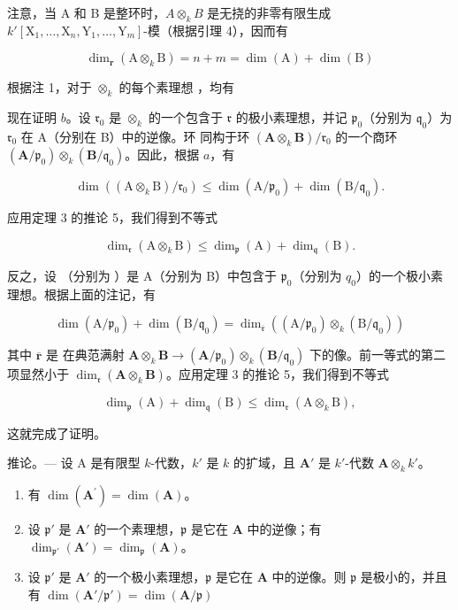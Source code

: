 注意，当 A 和 B 是整环时，\(A \otimes_k B\) 是无挠的非零有限生成 \(k'[\mathrm{X}_{1}, \ldots, \mathrm{X}_{n}, \mathrm{Y}_{1}, \ldots, \mathrm{Y}_{m}]\)-模（根据引理 4），因而有

\[
\dim_ {\mathbf {r}} (\mathrm{A} \otimes_ {k} \mathrm{B}) = n + m = \dim (\mathrm{A}) + \dim (\mathrm{B})
\]

  根据注 1，对于 \(\otimes_{k}\) 的每个素理想  ，均有

现在证明 \(b\)。设 \(\mathfrak{r}_{0}\) 是 \(\otimes_{k}\) 的一个包含于 \(\mathfrak{r}\) 的极小素理想，并记 \(\mathfrak{p}_{0}\)（分别为 \(\mathfrak{q}_{0}\)）为 \(\mathfrak{r}_{0}\) 在 A（分别在 B）中的逆像。环  同构于环 \((\mathbf{A} \otimes_k \mathbf{B}) / \mathfrak{r}_{0}\) 的一个商环 \((\mathbf{A} / \mathfrak{p}_{0}) \otimes_k (\mathbf{B} / \mathfrak{q}_{0})\)。因此，根据 \(a\)，有

\[
\dim \left(\left(\mathrm{A} \otimes_ {k} \mathrm{B}\right) / \mathfrak {r} _ {0}\right) \leqslant \dim (\mathrm{A} / \mathfrak {p} _ {0}) + \dim (\mathrm{B} / \mathfrak {q} _ {0}).
\]

应用定理 3 的推论 5，我们得到不等式

\[
\dim_ {\mathfrak {r}} (\mathrm{A} \otimes_ {k} \mathrm{B}) \leqslant \dim_ {\mathfrak {p}} (\mathrm{A}) + \dim_ {\mathfrak {q}} (\mathrm{B}).
\]

反之，设  （分别为 ）是 A（分别为 B）中包含于 \(\mathfrak{p}_{0}\)（分别为 \(q_{0}\)）的一个极小素理想。根据上面的注记，有

\[
\dim (\mathrm{A} / \mathfrak {p} _ {0}) + \dim (\mathrm{B} / \mathfrak {q} _ {0}) = \dim_ {\overline {{\mathfrak {r}}}} ((\mathrm{A} / \mathfrak {p} _ {0}) \otimes_ {k} (\mathrm{B} / \mathfrak {q} _ {0}))
\]

其中 \(\overline{\mathbf{r}}\) 是  在典范满射 \(\mathbf{A} \otimes_{k} \mathbf{B} \to (\mathbf{A}/\mathfrak{p}_{0}) \otimes_{k} (\mathbf{B}/\mathfrak{q}_{0})\) 下的像。前一等式的第二项显然小于 \(\dim_{\mathfrak{r}}(\mathbf{A} \otimes_{k} \mathbf{B})\)。应用定理 3 的推论 5，我们得到不等式

\[
\dim_ {\mathfrak {p}} (\mathrm{A}) + \dim_ {\mathfrak {q}} (\mathrm{B}) \leqslant \dim_ {\mathfrak {r}} (\mathrm{A} \otimes_ {k} \mathrm{B}),
\]

这就完成了证明。

推论。--- 设 A 是有限型 \(k\)-代数，\(k'\) 是 \(k\) 的扩域，且 \(\mathbf{A}'\) 是 \(k'\)-代数 \(\mathbf{A} \otimes_k k'\)。

\begin{enumerate}
\def\labelenumi{\alph{enumi})}
\item
  有 \(\dim (\mathbf{A}^{\prime}) = \dim (\mathbf{A})\)。
\item
  设 \(\mathfrak{p}'\) 是 \(\mathbf{A}'\) 的一个素理想，\(\mathfrak{p}\) 是它在 \(\mathbf{A}\) 中的逆像；有 \(\dim_{\mathfrak{p}'}(\mathbf{A}') = \dim_{\mathfrak{p}}(\mathbf{A})\)。
\item
  设 \(\mathfrak{p}'\) 是 \(\mathbf{A}'\) 的一个极小素理想，\(\mathfrak{p}\) 是它在 \(\mathbf{A}\) 中的逆像。则 \(\mathfrak{p}\) 是极小的，并且有 \(\dim(\mathbf{A}'/\mathfrak{p}') = \dim(\mathbf{A}/\mathfrak{p})\)
\end{enumerate}

